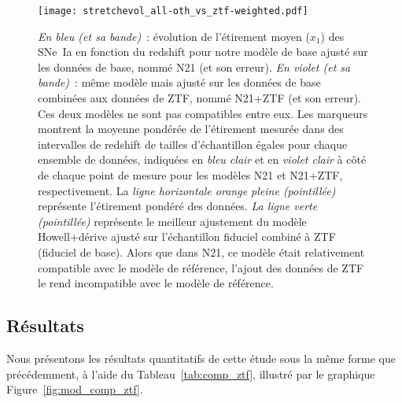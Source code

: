 \documentclass[../main/main.tex]{subfiles}
\begin{document}
\begin{figure}[ht]
    \centering
    \texttt{[image: stretchevol\_all-oth\_vs\_ztf-weighted.pdf]}
    \caption[Évolution de l'étirement moyen des SNe~Ia en fonction du redshift
    issu de la prédiction de notre modèle de base selon l'échantillon
    utilisé]{\footnotesize \textit{En bleu (et sa bande)}~: évolution de
        l'étirement moyen ($x_1$) des SNe~Ia en fonction du redshift pour notre
        modèle de base ajusté sur les données de base, nommé N21 (et son
        erreur). \textit{En violet (et sa bande)}~: même modèle mais ajusté sur
        les données de base combinées aux données de ZTF, nommé N21+ZTF (et son
        erreur). Ces deux modèles ne sont pas compatibles entre eux. Les
        marqueurs montrent la moyenne pondérée de l'étirement mesurée dans des
        intervalles de redshift de tailles d'échantillon égales pour chaque
        ensemble de données, indiquées en \textit{bleu clair} et en
        \textit{violet clair} à côté de chaque point de mesure pour les modèles
        N21 et N21+ZTF, respectivement. La \textit{ligne horizontale orange
        pleine (pointillée)} représente l'étirement pondéré des données.
        \textit{La ligne verte (pointillée)} représente le meilleur ajustement
        du modèle Howell+dérive ajusté sur l'échantillon fiduciel combiné à ZTF
        (fiduciel de base). Alors que dans N21, ce modèle était relativement
        compatible avec le modèle de référence, l'ajout des données de ZTF le
    rend incompatible avec le modèle de référence.}
    \label{fig:evol_all_ztf}
\end{figure}

\subsection{Résultats}\label{ssec:zres}

Nous présentons les résultats quantitatifs de cette étude sous la même forme que
précédemment, à l'aide du Tableau~\ref{tab:comp_ztf}, illustré par le graphique
Figure~\ref{fig:mod_comp_ztf}.
\end{document}
